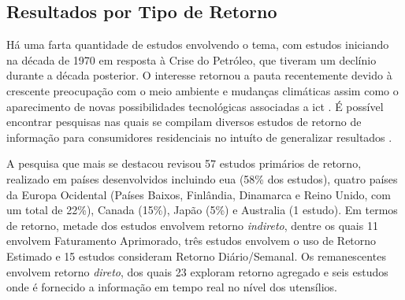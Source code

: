 \subsection{Resultados por Tipo de Retorno}
\label{ssec:ret_eff}

Há uma farta quantidade de estudos envolvendo o tema, com estudos iniciando na
década de 1970 em resposta à Crise do Petróleo, que tiveram um declínio durante
a década posterior. O interesse retornou a pauta recentemente devido à crescente 
preocupação com o meio ambiente e mudanças climáticas assim 
como o aparecimento de novas possibilidades tecnológicas 
associadas a \gls{ict} \cite{aceee_2010_estudos_feedback}. É
possível encontrar pesquisas nas quais se compilam diversos estudos
de retorno de informação para consumidores residenciais no intuíto de generalizar 
resultados \cite{aceee_2010_estudos_feedback,2011_zhifeng_smart_energy_savings,
2006_darby,2009_nber_studies_us,ucla_studies_1975_2011_usa}.

A pesquisa que mais se destacou \cite{aceee_2010_estudos_feedback} 
revisou 57 estudos primários de retorno, realizado em países 
desenvolvidos incluindo \gls{eua} (58\% dos
estudos), quatro países da Europa Ocidental (Países Baixos, Finlândia,
Dinamarca e Reino Unido, com um total de 22\%), Canada (15\%), Japão (5\%) e 
Australia (1 estudo). Em termos de retorno, metade dos estudos envolvem retorno
\emph{indireto}, dentre os quais 11 envolvem Faturamento Aprimorado, três
estudos envolvem o uso de Retorno Estimado e 15 estudos consideram Retorno
Diário/Semanal. Os remanescentes envolvem retorno \emph{direto}, dos quais 23
exploram retorno agregado e seis estudos onde é fornecido a informação em tempo
real no nível dos utensílios.



